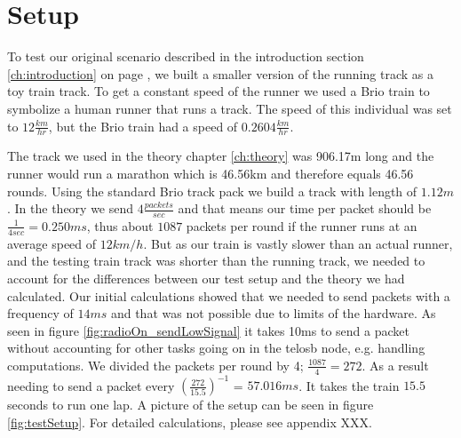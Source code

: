 \section{Setup}\label{sc:setup}

To test our original scenario described in the introduction section \ref{ch:introduction} on page \pageref{ch:introduction}, we built a smaller version of the running track as a toy train track. To get a constant speed of the runner we used a Brio train to symbolize a human runner that runs a track. The speed of this individual was set to $12\frac{km}{hr}$, but the Brio train had a speed of $0.2604\frac{km}{hr}$.

\noindent The track we used in the theory chapter \ref{ch:theory} was 906.17m long and the runner would run a marathon which is 46.56km and therefore equals 46.56 rounds. Using the standard Brio track pack we build a track with length of $1.12m$. In the theory we send $4\frac{packets}{sec}$ and that means our time per packet should be $\frac{1}{4sec} = 0.250ms$, thus about $1087$ packets per round if the runner runs at an average speed of $12km/h$. But as our train is vastly slower than an actual runner, and the testing train track was shorter than the running track, we needed to account for the differences between our test setup and the theory we had calculated. Our initial calculations showed that we needed to send packets with a frequency of $14ms$ and that was not possible due to limits of the hardware. As seen in figure \ref{fig:radioOn_sendLowSignal} it takes 10ms to send a packet without accounting for other tasks going on in the telosb node, e.g. handling computations. We divided the packets per round by 4; $\frac{1087}{4} = 272$. As a result needing to send a packet every $(\frac{272}{15.5})^{-1}$ = $57.016 ms$. It takes the train $15.5$ seconds to run one lap. A picture of the setup can be seen in figure \ref{fig:testSetup}. For detailed calculations, please see appendix XXX.
